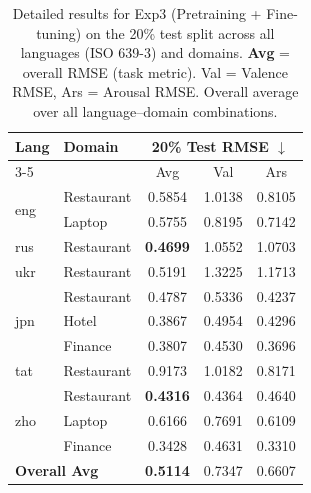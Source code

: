\begin{table}[h]
    \centering
    \footnotesize
    \setlength{\tabcolsep}{3.5pt}
    \renewcommand{\arraystretch}{1.05}
    \begin{tabular}{llccc}
    \toprule
    \multirow{2}{*}{\textbf{Lang}} &
    \multirow{2}{*}{\textbf{Domain}} &
    \multicolumn{3}{c}{\textbf{20\% Test RMSE} $\downarrow$} \\
    \cmidrule(l){3-5}
    & & {Avg} & {Val} & {Ars} \\
    \midrule
    \multirow{2}{*}{eng} & Restaurant & 0.5854 & 1.0138 & 0.8105 \\
                         & Laptop     & 0.5755 & 0.8195 & 0.7142 \\
    \midrule
    rus & Restaurant & \bfseries 0.4699 & 1.0552 & 1.0703 \\
    \midrule
    ukr & Restaurant & 0.5191 & 1.3225 & 1.1713 \\
    \midrule
    \multirow{3}{*}{jpn} & Restaurant & 0.4787 & 0.5336 & 0.4237 \\
                         & Hotel      & 0.3867 & 0.4954 & 0.4296 \\
                         & Finance    & 0.3807 & 0.4530 & 0.3696 \\
    \midrule
    tat & Restaurant & 0.9173 & 1.0182 & 0.8171 \\
    \midrule
    \multirow{3}{*}{zho} & Restaurant & \bfseries 0.4316 & 0.4364 & 0.4640 \\
                         & Laptop     & 0.6166 & 0.7691 & 0.6109 \\
                         & Finance    & 0.3428 & 0.4631 & 0.3310 \\
    \midrule
    \multicolumn{2}{l}{\textbf{Overall Avg}} & \bfseries 0.5114 & 0.7347 & 0.6607 \\
    \bottomrule
    \end{tabular}
    \caption{Detailed results for Exp3 (Pretraining + Fine-tuning) on the 20\% test split across all languages (ISO 639-3) and domains. \textbf{Avg} = overall RMSE (task metric). Val = Valence RMSE, Ars = Arousal RMSE. Overall average over all language--domain combinations.}
    \label{tab:detailed_results}
    \end{table}
    